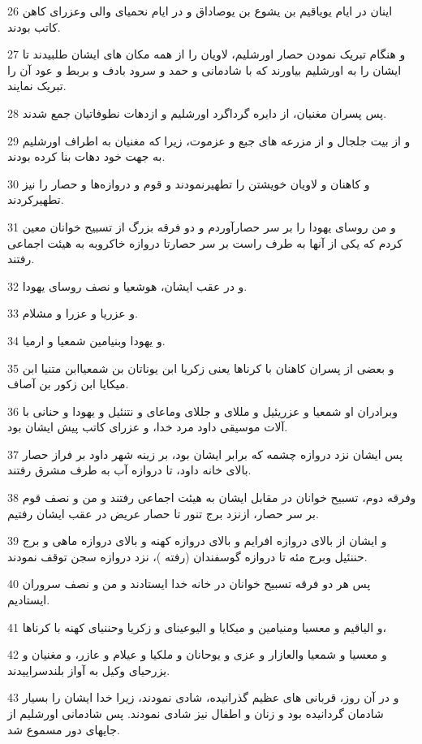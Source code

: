 \par 26 اینان در ایام یویاقیم بن یشوع بن یوصاداق و در ایام نحمیای والی وعزرای کاهن کاتب بودند.
\par 27 و هنگام تبریک نمودن حصار اورشلیم، لاویان را از همه مکان های ایشان طلبیدند تا ایشان را به اورشلیم بیاورند که با شادمانی و حمد و سرود بادف و بربط و عود آن را تبریک نمایند.
\par 28 پس پسران مغنیان، از دایره گرداگرد اورشلیم و ازدهات نطوفاتیان جمع شدند.
\par 29 و از بیت جلجال و از مزرعه های جبع و عزموت، زیرا که مغنیان به اطراف اورشلیم به جهت خود دهات بنا کرده بودند.
\par 30 و کاهنان و لاویان خویشتن را تطهیرنمودند و قوم و دروازه‌ها و حصار را نیز تطهیرکردند.
\par 31 و من روسای یهودا را بر سر حصارآوردم و دو فرقه بزرگ از تسبیح خوانان معین کردم که یکی از آنها به طرف راست بر سر حصارتا دروازه خاکروبه به هیئت اجماعی رفتند.
\par 32 و در عقب ایشان، هوشعیا و نصف روسای یهودا.
\par 33 و عزریا و عزرا و مشلام.
\par 34 و یهودا وبنیامین شمعیا و ارمیا.
\par 35 و بعضی از پسران کاهنان با کرناها یعنی زکریا ابن یوناتان بن شمعیاابن متنیا ابن میکایا ابن زکور بن آصاف.
\par 36 وبرادران او شمعیا و عزریئیل و مللای و جللای وماعای و نتنئیل و یهودا و حنانی با آلات موسیقی داود مرد خدا، و عزرای کاتب پیش ایشان بود.
\par 37 پس ایشان نزد دروازه چشمه که برابر ایشان بود، بر زینه شهر داود بر فراز حصار بالای خانه داود، تا دروازه آب به طرف مشرق رفتند.
\par 38 وفرقه دوم، تسبیح خوانان در مقابل ایشان به هیئت اجماعی رفتند و من و نصف قوم بر سر حصار، ازنزد برج تنور تا حصار عریض در عقب ایشان رفتیم.
\par 39 و ایشان از بالای دروازه افرایم و بالای دروازه کهنه و بالای دروازه ماهی و برج حننئیل وبرج مئه تا دروازه گوسفندان (رفته )، نزد دروازه سجن توقف نمودند.
\par 40 پس هر دو فرقه تسبیح خوانان در خانه خدا ایستادند و من و نصف سروران ایستادیم.
\par 41 و الیاقیم و معسیا ومنیامین و میکایا و الیوعینای و زکریا وحننیای کهنه با کرناها،
\par 42 و معسیا و شمعیا والعازار و عزی و یوحانان و ملکیا و عیلام و عازر، و مغنیان و یزرحیای وکیل به آواز بلندسراییدند.
\par 43 و در آن روز، قربانی های عظیم گذرانیده، شادی نمودند، زیرا خدا ایشان را بسیار شادمان گردانیده بود و زنان و اطفال نیز شادی نمودند. پس شادمانی اورشلیم از جایهای دور مسموع شد.
